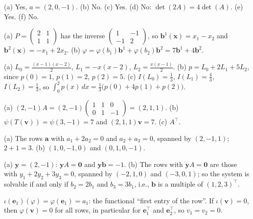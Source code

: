 \documentclass[11pt]{article}
\begin{document}
\begin{description}[leftmargin=0pt, itemsep=0.3em]
    \item[\ref{pr:functionals}.] (a) Yes, $a = (2, 0, -1)$. (b) No. (c) Yes. (d) No: $\det(2A) = 4\det(A)$. (e) Yes. (f) No.
    \item[\ref{pr:dual-basis-r2}.] (a) $P = \begin{pmatrix} 2 & 1 \\ 1 & 1 \end{pmatrix}$ has the inverse $\begin{pmatrix} 1 & -1 \\ -1 & 2 \end{pmatrix}$, so $\mathbf{b}^1(\mathbf{x}) = x_1 - x_2$ and $\mathbf{b}^2(\mathbf{x}) = -x_1 + 2x_2$. (b) $\varphi = \varphi(b_1) \mathbf{b}^1 + \varphi(b_2) \mathbf{b}^2 = 7\mathbf{b}^1 + 4\mathbf{b}^2$.
    \item[\ref{pr:lagrange-simpson}.] (a) $L_0 = \frac{(x - 1)(x - 2)}{2}$, $L_1 = -x(x - 2)$, $L_2 = \frac{x(x - 1)}{2}$. (b) $p = L_0 + 2L_1 + 5L_2$, since $p(0) = 1$, $p(1) = 2$, $p(2) = 5$. (c) $I(L_0) = \frac{1}{3}$, $I(L_1) = \frac{4}{3}$, $I(L_2) = \frac{1}{3}$, so $\int_0^2 p(x)\, dx = \frac{1}{3}\big(p(0) + 4p(1) + p(2)\big)$.
    \item[\ref{pr:dual-map}.] (a) $(2, -1)A = (2, -1)\begin{pmatrix} 1 & 1 & 0 \\ 0 & 1 & -1 \end{pmatrix} = (2, 1, 1)$. (b) $\psi(T(\mathbf{v})) = \psi(3, -1) = 7$ and $(2, 1, 1)\mathbf{v} = 7$. (c) $A^\top$.
    \item[\ref{pr:annihilator}.] (a) The rows $\mathbf{a}$ with $a_1 + 2a_2 = 0$ and $a_2 + a_3 = 0$, spanned by $(2, -1, 1)$; $2 + 1 = 3$. (b) $(1, 0, -1, 0)$ and $(0, 1, 0, -1)$.
    \item[\ref{pr:certificate}.] (a) $\mathbf{y} = (2, -1)$: $\mathbf{y}A = \mathbf{0}$ and $\mathbf{y}\mathbf{b} = -1$. (b) The rows with $\mathbf{y}A = \mathbf{0}$ are those with $y_1 + 2y_2 + 3y_3 = 0$, spanned by $(-2, 1, 0)$ and $(-3, 0, 1)$; so the system is solvable if and only if $b_2 = 2b_1$ and $b_3 = 3b_1$, i.e., $\mathbf{b}$ is a multiple of $(1, 2, 3)^\top$.
    \item[\ref{pr:double-dual}.] $\iota(\mathbf{e}_1)(\varphi) = \varphi(\mathbf{e}_1) = a_1$: the functional ``first entry of the row''. If $\iota(\mathbf{v}) = 0$, then $\varphi(\mathbf{v}) = 0$ for all rows, in particular for $\mathbf{e}_1^\top$ and $\mathbf{e}_2^\top$, so $v_1 = v_2 = 0$.
\end{description}
\end{document}
